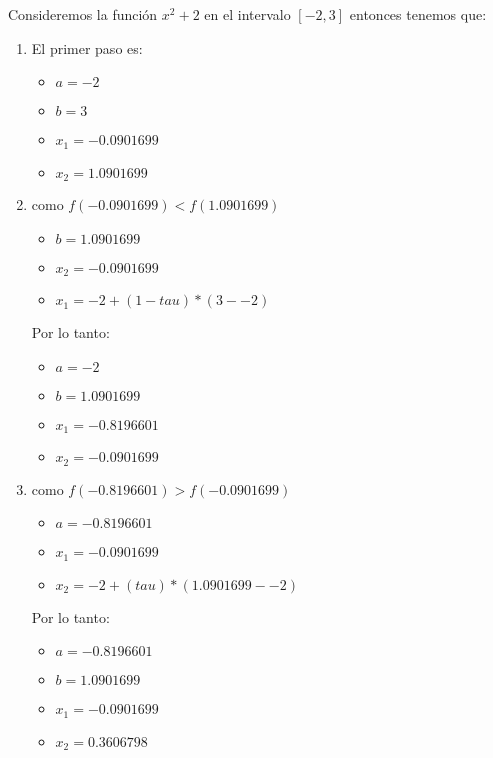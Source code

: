 \documentclass[12pt, fleqn]{article}                            %
\theoremstyle{break}                                            %
\begin{document}
        Consideremos la función $x^2 + 2$ en el intervalo $[-2, 3]$ entonces tenemos que:
        \begin{enumerate}
            \item El primer paso es:
                \begin{itemize}
                    \item $a = -2$
                    \item $b = 3$
                    \item $x_1 = -0.0901699$   
                    \item $x_2 = 1.0901699$
                \end{itemize}
        
            \item como $f(-0.0901699) < f(1.0901699)$ 
                \begin{itemize}
                    \item $b = 1.0901699$   
                    \item $x_2 = -0.0901699$   
                    \item $x_1 = -2 + (1 -tau) * (3 - -2)$
                \end{itemize}
                
                Por lo tanto:
                \begin{itemize}
                    \item $a = -2$
                    \item $b = 1.0901699$
                    \item $x_1 = -0.8196601$
                    \item $x_2 = -0.0901699$
                \end{itemize}

            \item como $f(-0.8196601) > f(-0.0901699)$
                \begin{itemize}
                    \item $a = -0.8196601$
                    \item $x_1 = -0.0901699$
                    \item $x_2 = -2+ (tau) * (1.0901699 - -2)$
                \end{itemize}

                Por lo tanto:
                \begin{itemize}
                    \item $a = -0.8196601$
                    \item $b = 1.0901699$
                    \item $x_1 = -0.0901699$
                    \item $x_2 = 0.3606798$
                \end{itemize}


\end{enumerate}
\end{document}
